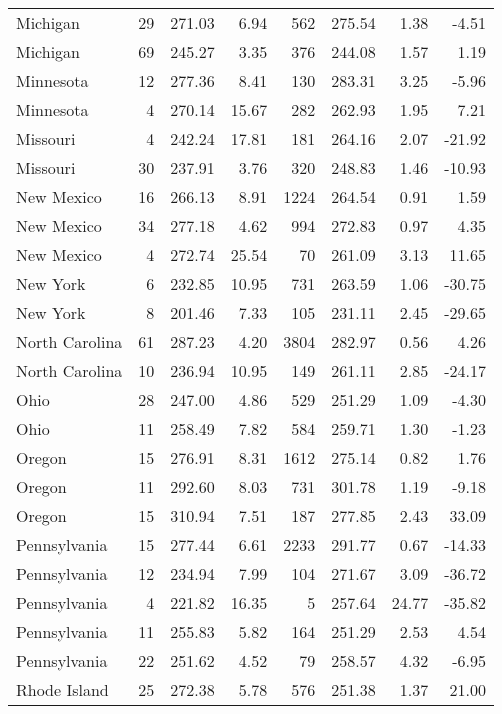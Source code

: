\begin{longtable}{lrrr@{\extracolsep{10pt}}rrrr}
  Michigan &  29 & 271.03 & 6.94 & 562 & 275.54 & 1.38 & -4.51 \\ 
  Michigan &  69 & 245.27 & 3.35 & 376 & 244.08 & 1.57 & 1.19 \\ 
  Minnesota &  12 & 277.36 & 8.41 & 130 & 283.31 & 3.25 & -5.96 \\ 
  Minnesota &   4 & 270.14 & 15.67 & 282 & 262.93 & 1.95 & 7.21 \\ 
  Missouri &   4 & 242.24 & 17.81 & 181 & 264.16 & 2.07 & -21.92 \\ 
  Missouri &  30 & 237.91 & 3.76 & 320 & 248.83 & 1.46 & -10.93 \\ 
  New Mexico &  16 & 266.13 & 8.91 & 1224 & 264.54 & 0.91 & 1.59 \\ 
  New Mexico &  34 & 277.18 & 4.62 & 994 & 272.83 & 0.97 & 4.35 \\ 
  New Mexico &   4 & 272.74 & 25.54 &  70 & 261.09 & 3.13 & 11.65 \\ 
  New York &   6 & 232.85 & 10.95 & 731 & 263.59 & 1.06 & -30.75 \\ 
  New York &   8 & 201.46 & 7.33 & 105 & 231.11 & 2.45 & -29.65 \\ 
  North Carolina &  61 & 287.23 & 4.20 & 3804 & 282.97 & 0.56 & 4.26 \\ 
  North Carolina &  10 & 236.94 & 10.95 & 149 & 261.11 & 2.85 & -24.17 \\ 
  Ohio &  28 & 247.00 & 4.86 & 529 & 251.29 & 1.09 & -4.30 \\ 
  Ohio &  11 & 258.49 & 7.82 & 584 & 259.71 & 1.30 & -1.23 \\ 
  Oregon &  15 & 276.91 & 8.31 & 1612 & 275.14 & 0.82 & 1.76 \\ 
  Oregon &  11 & 292.60 & 8.03 & 731 & 301.78 & 1.19 & -9.18 \\ 
  Oregon &  15 & 310.94 & 7.51 & 187 & 277.85 & 2.43 & 33.09 \\ 
  Pennsylvania &  15 & 277.44 & 6.61 & 2233 & 291.77 & 0.67 & -14.33 \\ 
  Pennsylvania &  12 & 234.94 & 7.99 & 104 & 271.67 & 3.09 & -36.72 \\ 
  Pennsylvania &   4 & 221.82 & 16.35 &   5 & 257.64 & 24.77 & -35.82 \\ 
  Pennsylvania &  11 & 255.83 & 5.82 & 164 & 251.29 & 2.53 & 4.54 \\ 
  Pennsylvania &  22 & 251.62 & 4.52 &  79 & 258.57 & 4.32 & -6.95 \\ 
  Rhode Island &  25 & 272.38 & 5.78 & 576 & 251.38 & 1.37 & 21.00 \\ 

\end{longtable}
